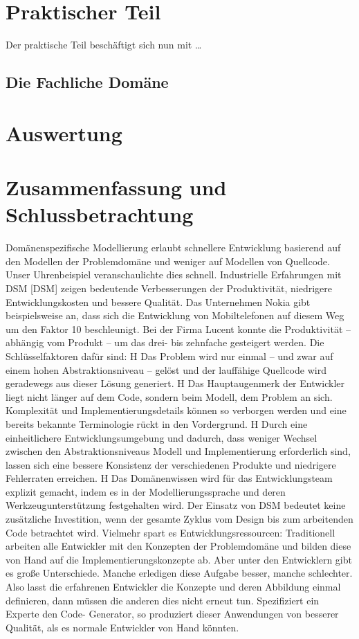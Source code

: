 \documentclass[11pt,english,ngerman, headsepline]{scrreprt}
\begin{document}
 
 
\chapter{Praktischer Teil}
Der praktische Teil beschäftigt sich nun mit \ldots

\section{Die Fachliche Domäne}

\chapter{Auswertung}

\chapter{Zusammenfassung und Schlussbetrachtung}

Domänenspezifische Modellierung erlaubt schnellere Entwicklung
basierend auf den Modellen der Problemdomäne und weniger auf
Modellen von Quellcode. Unser Uhrenbeispiel veranschaulichte dies
schnell. Industrielle Erfahrungen mit DSM [DSM] zeigen bedeutende
Verbesserungen der Produktivität, niedrigere Entwicklungskosten
und bessere Qualität. Das Unternehmen Nokia gibt beispielsweise
an, dass sich die Entwicklung von Mobiltelefonen auf
diesem Weg um den Faktor 10 beschleunigt. Bei der Firma Lucent
konnte die Produktivität – abhängig vom Produkt – um das drei- bis
zehnfache gesteigert werden. Die Schlüsselfaktoren dafür sind:
H Das Problem wird nur einmal – und zwar auf einem hohen
Abstraktionsniveau – gelöst und der lauffähige Quellcode
wird geradewegs aus dieser Lösung generiert.
H Das Hauptaugenmerk der Entwickler liegt nicht länger auf dem
Code, sondern beim Modell, dem Problem an sich. Komplexität
und Implementierungsdetails können so verborgen werden und
eine bereits bekannte Terminologie rückt in den Vordergrund.
H Durch eine einheitlichere Entwicklungsumgebung und dadurch,
dass weniger Wechsel zwischen den Abstraktionsniveaus
Modell und Implementierung erforderlich sind, lassen
sich eine bessere Konsistenz der verschiedenen Produkte
und niedrigere Fehlerraten erreichen.
H Das Domänenwissen wird für das Entwicklungsteam explizit
gemacht, indem es in der Modellierungssprache und deren
Werkzeugunterstützung festgehalten wird.
Der Einsatz von DSM bedeutet keine zusätzliche Investition,
wenn der gesamte Zyklus vom Design bis zum arbeitenden
Code betrachtet wird. Vielmehr spart es Entwicklungsressourcen:
Traditionell arbeiten alle Entwickler mit den Konzepten der
Problemdomäne und bilden diese von Hand auf die Implementierungskonzepte
ab. Aber unter den Entwicklern gibt es große
Unterschiede. Manche erledigen diese Aufgabe besser, manche
schlechter. Also lasst die erfahrenen Entwickler die Konzepte
und deren Abbildung einmal definieren, dann müssen die anderen
dies nicht erneut tun. Spezifiziert ein Experte den Code-
Generator, so produziert dieser Anwendungen von besserer
Qualität, als es normale Entwickler von Hand könnten.
 \cite{dsmUhrenArtikel}
 
\end{document}
